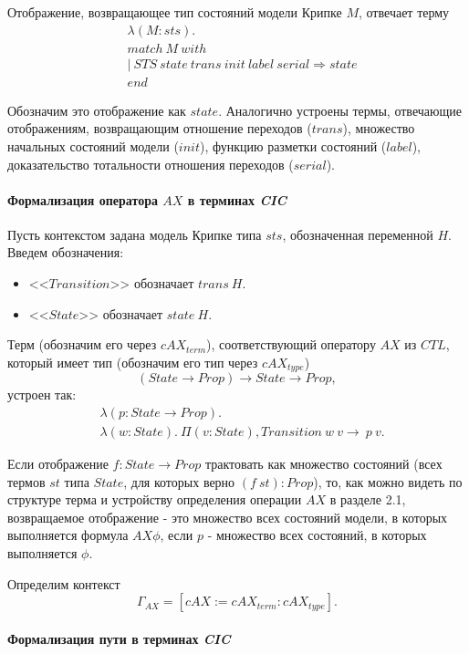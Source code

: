 \documentclass[12pt]{article}
\begin{document}
Отображение, возвращающее тип состояний модели Крипке $M$, отвечает терму
\begin{align*}
&\lambda (M:sts).\\
& match\ M\ with \\
& |\ STS\ state\ trans\ init\ label\ serial \Rightarrow state \\
& end
\end{align*}

Обозначим это отображение как $state$.
Аналогично устроены термы, отвечающие отображениям, возвращающим отношение переходов ($trans$), множество начальных состояний модели ($init$), функцию разметки состояний ($label$), доказательство тотальности отношения переходов ($serial$).


\paragraph{Формализация оператора $AX$ в терминах \textit{CIC}}\mbox{}

Пусть контекстом задана модель Крипке типа $sts$, обозначенная переменной $H$.
Введем обозначения:
\begin{itemize}
    \item <<$Transition$>> обозначает $trans\ H$.
    \item <<$State$>> обозначает $state\ H$.
\end{itemize}

Терм (обозначим его через $cAX_{term}$), соответствующий оператору $AX$ из $CTL$, который имеет тип (обозначим его тип через $cAX_{type}$) 
$$(State \xrightarrow{} Prop) \xrightarrow{} State \xrightarrow{} Prop,$$
устроен так:
\begin{align*}
& \lambda (p : State \xrightarrow{} Prop). \\ 
& \lambda (w : State).\ \Pi (v : State), Transition\ w\ v \xrightarrow{}\ p\ v.
\end{align*}

Если отображение $f : State \xrightarrow{} Prop$ трактовать как множество состояний (всех термов $st$ типа $State$, для которых верно $(f\ st) : Prop$), то, как можно видеть по структуре терма и устройству определения операции $AX$ в разделе 2.1, возвращаемое отображение - это множество всех состояний модели, в которых выполняется формула $AX \phi$, если $p$ - множество всех состояний, в которых выполняется $\phi$.

Определим контекст $$\Gamma_{AX} = [cAX:=cAX_{term}:cAX_{type}].$$

\paragraph{Формализация пути в терминах \textit{CIC}}\mbox{} 
\end{document}
